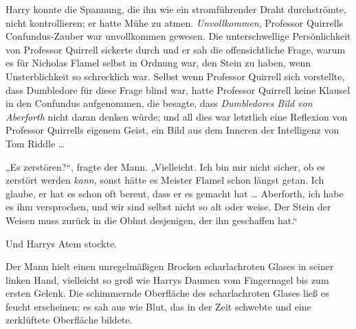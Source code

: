 Harry konnte die Spannung, die ihn wie ein stromführender Draht durchströmte, nicht kontrollieren; er hatte Mühe zu atmen. \emph{Unvollkommen}, Professor Quirrells Confundus-Zauber war unvollkommen gewesen. Die unterschwellige Persönlichkeit von Professor Quirrell sickerte durch und er sah die offensichtliche Frage, warum es für Nicholas Flamel selbst in Ordnung war, den Stein zu haben, wenn Unsterblichkeit so schrecklich war. Selbst wenn Professor Quirrell sich vorstellte, dass Dumbledore für diese Frage blind war, hatte Professor Quirrell keine Klausel in den Confundus aufgenommen, die besagte, dass \emph{Dumbledores Bild von Aberforth} nicht daran denken würde; und all dies war letztlich eine Reflexion von Professor Quirrells eigenem Geist, ein Bild aus dem Inneren der Intelligenz von Tom Riddle …

„Es zerstören?“, fragte der Mann.
„Vielleicht. Ich bin mir nicht sicher, ob es zerstört werden \emph{kann}, sonst hätte es Meister Flamel schon längst getan. Ich glaube, er hat es schon oft bereut, dass er es gemacht hat … Aberforth, ich habe es ihm versprochen, und wir sind selbst nicht so alt oder weise. Der Stein der Weisen muss zurück in die Obhut desjenigen, der ihn geschaffen hat.“

Und Harrys Atem stockte.

Der Mann hielt einen unregelmäßigen Brocken scharlachroten Glases in seiner linken Hand, vielleicht so groß wie Harrys Daumen vom Fingernagel bis zum ersten Gelenk. Die schimmernde Oberfläche des scharlachroten Glases ließ es feucht erscheinen; es sah aus wie Blut, das in der Zeit schwebte und eine zerklüftete Oberfläche bildete.

